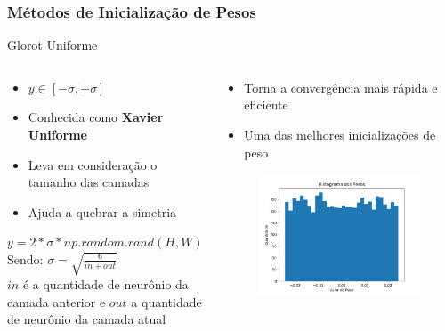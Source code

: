 \documentclass{beamer}
\begin{document}
\begin{frame}
	\frametitle{Métodos de Inicialização de Pesos}
	\begin{block}{Glorot Uniforme}
		\begin{columns}
			\begin{column}{0.6 \textwidth}
				\begin{itemize}
					\item $y \in [-\sigma, +\sigma]$
					\item Conhecida como \textbf{Xavier Uniforme}
					\item Leva em consideração o tamanho das camadas
					\item Ajuda a quebrar a simetria
				\end{itemize}
				$	y = 2 * \sigma * np.random.rand(H, W) - \sigma$ \\
				Sendo:
				$\sigma = \sqrt{\frac{6}{in + out}}$ \\
				$in$ é a quantidade de neurônio da camada anterior e $out$ a quantidade de neurônio da camada atual
			\end{column}
		\begin{column}{0.4 \textwidth}
			\begin{itemize}
				\item Torna a convergência mais rápida e eficiente
				\item Uma das melhores inicializações de peso
			\end{itemize}
			\begin{figure}
				\centering
				\includegraphics[width=1\linewidth]{figures/pesos_glorot_uniform.png}
			\end{figure}
		\end{column}
		\end{columns}
	\end{block}
\end{frame}
\end{document}

